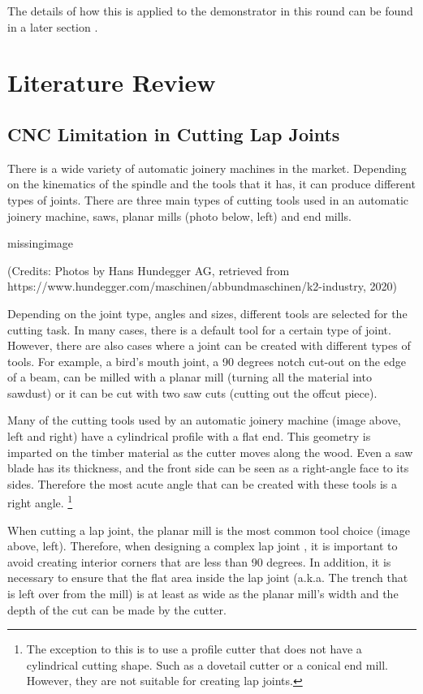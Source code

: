 The details of how this is applied to the demonstrator in this round can be found in a later section .

\section{Literature Review}
\label{section:exploration_4_literature_review}

\subsection{CNC Limitation in Cutting Lap Joints}
\label{subsection:exploration_4_cnc_limitation_in_cutting_lap_joints}

There is a wide variety of automatic joinery machines in the market. Depending on the kinematics of the spindle and the tools that it has, it can produce different types of joints. There are three main types of cutting tools used in an automatic joinery machine, saws, planar mills (photo below, left) and end mills. 

missingimage

(Credits: Photos by Hans Hundegger AG, retrieved from https://www.hundegger.com/maschinen/abbundmaschinen/k2-industry, 2020)

Depending on the joint type, angles and sizes, different tools are selected for the cutting task. In many cases, there is a default tool for a certain type of joint. However, there are also cases where a joint can be created with different types of tools. For example, a bird's mouth joint, a 90 degrees notch cut-out on the edge of a beam, can be milled with a planar mill (turning all the material into sawdust) or it can be cut with two saw cuts (cutting out the offcut piece).

Many of the cutting tools used by an automatic joinery machine (image above, left and right) have a cylindrical profile with a flat end. This geometry is imparted on the timber material as the cutter moves along the wood. Even a saw blade has its thickness, and the front side can be seen as a right-angle face to its sides. Therefore the most acute angle that can be created with these tools is a right angle.
\footnote{The exception to this is to use a profile cutter that does not have a cylindrical cutting shape. Such as a dovetail cutter or a conical end mill. However, they are not suitable for creating lap joints.}

When cutting a lap joint, the planar mill is the most common tool choice (image above, left). Therefore, when designing a complex lap joint , it is important to avoid creating interior corners that are less than 90 degrees. In addition, it is necessary to ensure that the flat area inside the lap joint (a.k.a. The trench that is left over from the mill) is at least as wide as the planar mill’s width and the depth of the cut can be made by the cutter.

